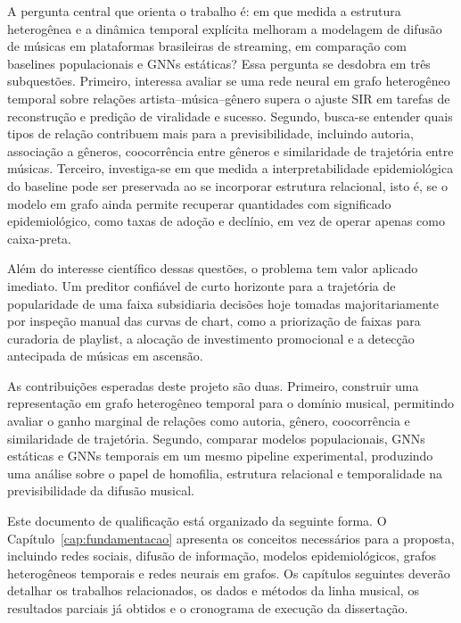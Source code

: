 A pergunta central que orienta o trabalho é: em que medida a estrutura heterogênea e a dinâmica temporal explícita melhoram a modelagem de difusão de músicas em plataformas brasileiras de streaming, em comparação com baselines populacionais e GNNs estáticas? Essa pergunta se desdobra em três subquestões. Primeiro, interessa avaliar se uma rede neural em grafo heterogêneo temporal sobre relações artista--música--gênero supera o ajuste SIR em tarefas de reconstrução e predição de viralidade e sucesso. Segundo, busca-se entender quais tipos de relação contribuem mais para a previsibilidade, incluindo autoria, associação a gêneros, coocorrência entre gêneros e similaridade de trajetória entre músicas. Terceiro, investiga-se em que medida a interpretabilidade epidemiológica do baseline pode ser preservada ao se incorporar estrutura relacional, isto é, se o modelo em grafo ainda permite recuperar quantidades com significado epidemiológico, como taxas de adoção e declínio, em vez de operar apenas como caixa-preta.

Além do interesse científico dessas questões, o problema tem valor aplicado imediato. Um preditor confiável de curto horizonte para a trajetória de popularidade de uma faixa subsidiaria decisões hoje tomadas majoritariamente por inspeção manual das curvas de chart, como a priorização de faixas para curadoria de playlist, a alocação de investimento promocional e a detecção antecipada de músicas em ascensão.

As contribuições esperadas deste projeto são duas. Primeiro, construir uma representação em grafo heterogêneo temporal para o domínio musical, permitindo avaliar o ganho marginal de relações como autoria, gênero, coocorrência e similaridade de trajetória. Segundo, comparar modelos populacionais, GNNs estáticas e GNNs temporais em um mesmo pipeline experimental, produzindo uma análise sobre o papel de homofilia, estrutura relacional e temporalidade na previsibilidade da difusão musical.

Este documento de qualificação está organizado da seguinte forma. O Capítulo~\ref{cap:fundamentacao} apresenta os conceitos necessários para a proposta, incluindo redes sociais, difusão de informação, modelos epidemiológicos, grafos heterogêneos temporais e redes neurais em grafos. Os capítulos seguintes deverão detalhar os trabalhos relacionados, os dados e métodos da linha musical, os resultados parciais já obtidos e o cronograma de execução da dissertação.
